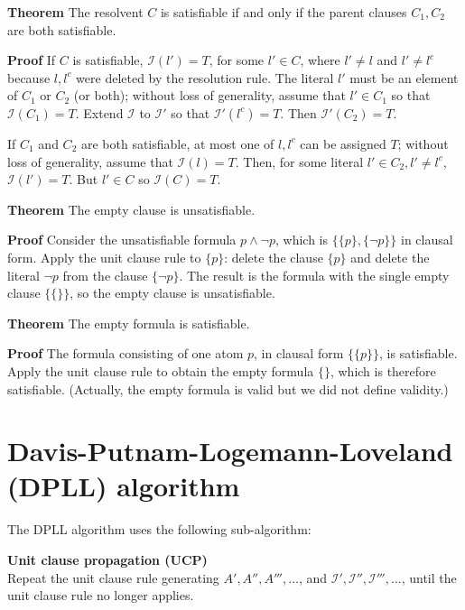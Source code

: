 \documentclass[11pt]{report}
\begin{document}
\textbf{Theorem} The resolvent $C$ is satisfiable if and only if the parent clauses $C_{1},C_{2}$ are both satisfiable.

\textbf{Proof} If $C$ is satisfiable, $\mathcal{I}(l')=T$, for some $l'\in C$, where $l'\neq l$ and $l'\neq l^c$ because $l,l^c$ were deleted by the resolution rule. The literal $l'$ must be an element of $C_1$ or $C_2$ (or both); without loss of generality, assume that $l'\in C_1$ so that $\mathcal{I}(C_1)=T$. Extend $\mathcal{I}$ to $\mathcal{I'}$ so that $\mathcal{I'}(l^c)=T$. Then $\mathcal{I'}(C_2)=T$.

If $C_1$ and $C_2$ are both satisfiable, at most one of $l,l^c$ can be assigned $T$; without loss of generality, assume that $\mathcal{I}(l)=T$. Then, for some literal $l'\in C_2, l'\neq l^c$, $\mathcal{I}(l')=T$. But $l'\in C$ so $\mathcal{I}(C)=T$.

\bigskip

\textbf{Theorem} The empty clause is unsatisfiable.

\textbf{Proof} Consider the unsatisfiable formula $p \wedge \neg p$, which is $\{\{p\}, \{\neg p\}\}$ in clausal form. Apply the unit clause rule to $\{p\}$: delete the clause $\{p\}$ and delete the literal $\neg p$ from the clause $\{\neg p\}$. The result is the formula with the single empty clause $\{\{\}\}$, so the empty clause is unsatisfiable. 

\bigskip

\textbf{Theorem} The empty formula is satisfiable.

\textbf{Proof} The formula consisting of one atom $p$, in clausal form $\{\{p\}\}$, is satisfiable. Apply the unit clause rule to obtain the empty formula $\{\}$, which is therefore satisfiable.
(Actually, the empty formula is valid but we did not define validity.)

\newpage


\section{Davis-Putnam-Logemann-Loveland (DPLL) algorithm}\label{s.dpll}

The DPLL algorithm uses the following sub-algorithm:

\textbf{Unit clause propagation (UCP)}\\
Repeat the unit clause rule generating $A', A'', A''', \ldots$, and $\mathcal{I}', \mathcal{I}'', \mathcal{I}''',\ldots$, until the unit clause rule no longer applies.
\end{document}

